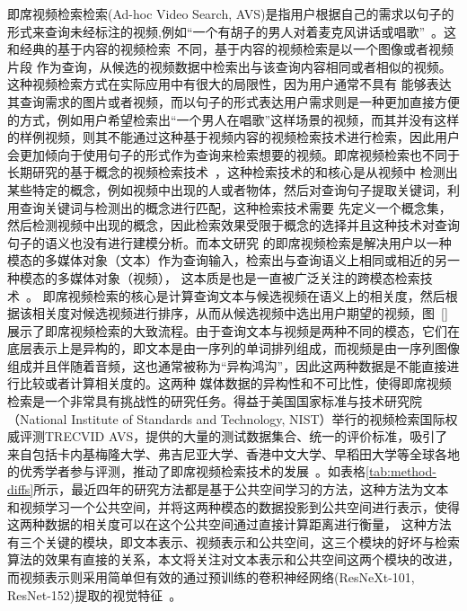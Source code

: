 即席视频检索检索(Ad-hoc Video Search, AVS)是指用户根据自己的需求以句子的形式来查询未经标注的视频,例如“一个有胡子的男人对着麦克风讲话或唱歌”~\cite{awad2016trecvid}。这和经典的基于内容的视频检索~\cite{yu2015content}不同，基于内容的视频检索是以一个图像或者视频片段
作为查询，从候选的视频数据中检索出与该查询内容相同或者相似的视频。这种视频检索方式在实际应用中有很大的局限性，因为用户通常不具有
能够表达其查询需求的图片或者视频，而以句子的形式表达用户需求则是一种更加直接方便的方式，例如用户希望检索出“一个男人在唱歌”这样场景的视频，而其并没有这样的样例视频，则其不能通过这种基于视频内容的视频检索技术进行检索，因此用户会更加倾向于使用句子的形式作为查询来检索想要的视频。即席视频检索也不同于长期研究的基于概念的视频检索技术~\cite{snoekcees2009concept}，这种检索技术的和核心是从视频中
检测出某些特定的概念，例如视频中出现的人或者物体，然后对查询句子提取关键词，利用查询关键词与检测出的概念进行匹配，这种检索技术需要
先定义一个概念集，然后检测视频中出现的概念，因此检索效果受限于概念的选择并且这种技术对查询句子的语义也没有进行建模分析。而本文研究
的即席视频检索是解决用户以一种模态的多媒体对象（文本）作为查询输入，检索出与查询语义上相同或相近的另一种模态的多媒体对象（视频），
这本质是也是一直被广泛关注的跨模态检索技术~\cite{rasiwasia2010a,feng2014cross,pereira2014on,suris2018cross,mithun2018learning}。
即席视频检索的核心是计算查询文本与候选视频在语义上的相关度，然后根据该相关度对候选视频进行排序，从而从候选视频中选出用户期望的视频，图~\ref{}展示了即席视频检索的大致流程。由于查询文本与视频是两种不同的模态，它们在底层表示上是异构的，即文本是由一序列的单词排列组成，而视频是由一序列图像组成并且伴随着音频，这也通常被称为“异构鸿沟”，因此这两种数据是不能直接进行比较或者计算相关度的。这两种
媒体数据的异构性和不可比性，使得即席视频检索是一个非常具有挑战性的研究任务。得益于美国国家标准与技术研究院（National Institute of Standards and Technology, NIST）举行的视频检索国际权威评测TRECVID AVS，提供的大量的测试数据集合、统一的评价标准，吸引了来自包括卡内基梅隆大学、弗吉尼亚大学、香港中文大学、早稻田大学等全球各地的优秀学者参与评测，推动了即席视频检索技术的发展~\cite{awad2016trecvid,awad2017trecvid,awad2018trecvid,awad2019trecvid}。如表格\ref{tab:method-diffs}所示，最近四年的研究方法都是基于公共空间学习的方法，这种方法为文本和视频学习一个公共空间，并将这两种模态的数据投影到公共空间进行表示，使得这两种数据的相关度可以在这个公共空间通过直接计算距离进行衡量，
这种方法有三个关键的模块，即文本表示、视频表示和公共空间，这三个模块的好坏与检索算法的效果有直接的关系，本文将关注对文本表示和公共空间这两个模块的改进，而视频表示则采用简单但有效的通过预训练的卷积神经网络(ResNeXt-101, ResNet-152)提取的视觉特征~\cite{li2018renmin,li2019renmin}。

